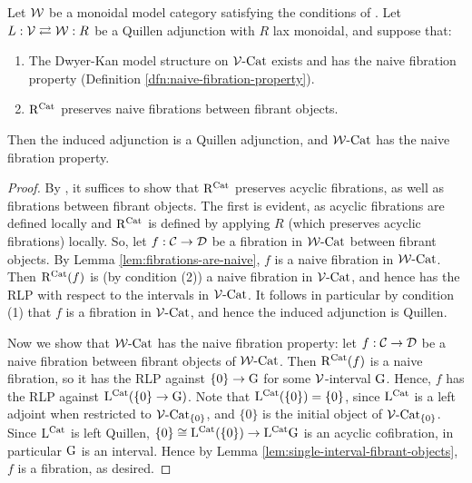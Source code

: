 \documentclass[12pt]{amsart}
\begin{document}
\begin{theorem}\label{thm:naive-fibration-transfer}
	Let $\mathcal{W}$ be a monoidal model category satisfying the conditions of \cite[Theorem 1.10]{BergerMoerdijk2012}. 
	Let $L: \mathcal{V} \rightleftarrows \mathcal{W}: R$ be a Quillen adjunction with $R$ lax monoidal, and suppose that: 
	\begin{enumerate}
		\item The Dwyer-Kan model structure on $\mathcal{V}\text{-}\mathrm{Cat}$ exists and has the naive fibration property (Definition \ref{dfn:naive-fibration-property}).
		\item $\mathrm{R}^{\mathrm{Cat}}$ preserves naive fibrations between fibrant objects.
	\end{enumerate}
	Then the induced adjunction 
	is a Quillen adjunction, and $\mathcal{W}\text{-}\mathrm{Cat}$ has the naive fibration property. 
\end{theorem}
\begin{proof}
	By \cite[Proposition 6.18]{Joyal2007}, it suffices to show that $\mathrm{R}^{\mathrm{Cat}}$ preserves acyclic fibrations, as well as fibrations between fibrant objects. 
	The first is evident, as acyclic fibrations are defined locally and $\mathrm{R}^{\mathrm{Cat}}$ is defined by applying $R$ (which preserves acyclic fibrations) locally. So, let $f : \mathcal{C} \to \mathcal{D}$ be a fibration in $\mathcal{W}\text{-}\mathrm{Cat}$ between fibrant objects. 
	By Lemma \ref{lem:fibrations-are-naive}, $f$ is a naive fibration in $\mathcal{W}\text{-}\mathrm{Cat}$. 
	Then $\mathrm{R}^{\mathrm{Cat}}(f)$ is (by condition (2)) a naive fibration in $\mathcal{V}\text{-}\mathrm{Cat}$, and hence has the RLP with respect to the intervals in $\mathcal{V}\text{-}\mathrm{Cat}$. 
	It follows in particular by condition (1) that $f$ is a fibration in $\mathcal{V}\text{-}\mathrm{Cat}$, and hence the induced adjunction is Quillen. 
	\par 
	Now we show that $\mathcal{W}\text{-}\mathrm{Cat}$ has the naive fibration property: let $f: \mathcal{C} \to \mathcal{D}$ be a naive fibration between fibrant objects of $\mathcal{W}\text{-}\mathrm{Cat}$. 
	Then $\mathrm{R}^{\mathrm{Cat}}(f)$ is a naive fibration, so it has the RLP against $\{0\} \to \mathrm{G}$ for some $\mathcal{V}$-interval $\mathrm{G}$. 
	Hence, $f$ has the RLP against $\mathrm{L}^{\mathrm{Cat}}(\{0\} \to \mathrm{G})$.
	Note that $\mathrm{L}^{\mathrm{Cat}}(\{0\}) = \{0\}$, since $\mathrm{L}^{\mathrm{Cat}}$ is a left adjoint when restricted to $\mathcal{V}\text{-}\mathrm{Cat}_{\{0\}}$, and $\{0\}$ is the initial object of $\mathcal{V}\text{-}\mathrm{Cat}_{\{0\}}$. 
	Since $\mathrm{L}^{\mathrm{Cat}}$ is left Quillen, $\{0\} \cong \mathrm{L}^{\mathrm{Cat}}(\{0\}) \to \mathrm{L}^{\mathrm{Cat}}\mathrm{G}$ is an acyclic cofibration, in particular $\mathrm{G}$ is an interval. Hence by Lemma \ref{lem:single-interval-fibrant-objects}, $f$ is a fibration, as desired.
\end{proof}
\end{document}

